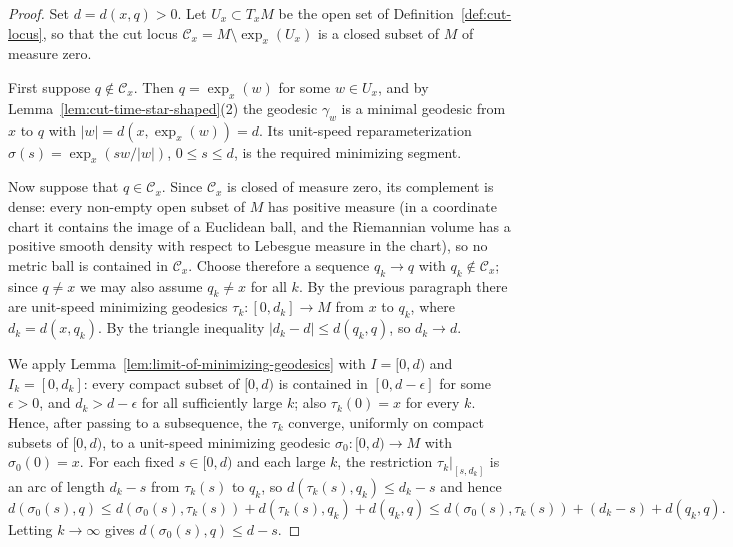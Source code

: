 \begin{proof}
\leanok
{}
Set $d=d(x,q)>0$. Let $U_x\subset T_xM$ be the open set of
Definition~\ref{def:cut-locus}, so that the cut locus ${\mathcal
C}_x=M\setminus \exp_x(U_x)$ is a closed subset of $M$ of measure
zero.

First suppose $q\notin{\mathcal C}_x$. Then $q=\exp_x(w)$ for some
$w\in U_x$, and by Lemma~\ref{lem:cut-time-star-shaped}(2) the
geodesic $\gamma_w$ is a minimal geodesic from $x$ to $q$ with
$|w|=d(x,\exp_x(w))=d$. Its unit-speed reparameterization
$\sigma(s)=\exp_x(sw/|w|)$, $0\le s\le d$, is the required
minimizing segment.

Now suppose that $q\in{\mathcal C}_x$. Since ${\mathcal C}_x$ is
closed of measure zero, its complement is dense: every non-empty open subset
of $M$ has positive measure (in a coordinate chart it contains the
image of a Euclidean ball, and the Riemannian volume has a positive
smooth density with respect to Lebesgue measure in the chart), so
no metric ball is contained in ${\mathcal C}_x$. Choose therefore a
sequence $q_k\rightarrow q$ with $q_k\notin{\mathcal C}_x$; since
$q\not=x$ we may also assume $q_k\not=x$ for all $k$. By the
previous paragraph there are unit-speed minimizing geodesics
$\tau_k\colon [0,d_k]\to M$ from $x$ to $q_k$, where
$d_k=d(x,q_k)$. By the triangle inequality $|d_k-d|\le d(q_k,q)$,
so $d_k\rightarrow d$.

We apply Lemma~\ref{lem:limit-of-minimizing-geodesics} with
$I=[0,d)$ and $I_k=[0,d_k]$: every compact subset of $[0,d)$ is
contained in $[0,d-\epsilon]$ for some $\epsilon>0$, and
$d_k>d-\epsilon$ for all sufficiently large $k$; also
$\tau_k(0)=x$ for every $k$. Hence, after passing to a subsequence,
the $\tau_k$ converge, uniformly on compact subsets of $[0,d)$, to
a unit-speed minimizing geodesic $\sigma_0\colon [0,d)\to M$ with
$\sigma_0(0)=x$. For each fixed $s\in[0,d)$ and each large $k$, the
restriction $\tau_k|_{[s,d_k]}$ is an arc of length $d_k-s$ from
$\tau_k(s)$ to $q_k$, so $d(\tau_k(s),q_k)\le d_k-s$ and hence
$$d(\sigma_0(s),q)\le
d(\sigma_0(s),\tau_k(s))+d(\tau_k(s),q_k)+d(q_k,q)\le
d(\sigma_0(s),\tau_k(s))+(d_k-s)+d(q_k,q).$$
Letting $k\rightarrow\infty$ gives $d(\sigma_0(s),q)\le d-s$.


\end{proof}

